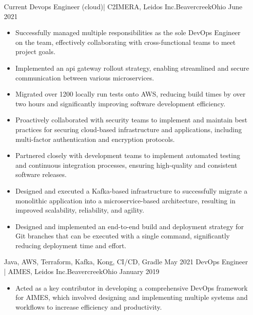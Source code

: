 %
%
%
\begin{experiences}

  \experience
  {Current} {Devops Engineer (cloud)| C2IMERA, Leidos Inc.}{Beavercreek}{Ohio}
  {June 2021} {
      \begin{itemize}
          \item Successfully managed multiple responsibilities as the sole DevOps Engineer on the team, effectively collaborating with cross-functional teams to meet project goals.
          \item Implemented an api gateway rollout strategy, enabling streamlined and secure communication between various microservices.
          \item Migrated over 1200 locally run tests onto AWS, reducing build times by over two hours and significantly improving software development efficiency.
          \item Proactively collaborated with security teams to implement and maintain best practices for securing cloud-based infrastructure and applications, including multi-factor authentication and encryption protocols.
          \item Partnered closely with development teams to implement automated testing and continuous integration processes, ensuring high-quality and consistent software releases.
          \item Designed and executed a Kafka-based infrastructure to successfully migrate a monolithic application into a microservice-based architecture, resulting in improved scalability, reliability, and agility.
          \item Designed and implemented an end-to-end build and deployment strategy for Git branches that can be executed with a single command, significantly reducing deployment time and effort.
      \end{itemize}
  }
  {Java, AWS, Terraform, Kafka, Kong, CI/CD, Gradle}
  \emptySeparator
  \experience
  {May 2021} {DevOps Engineer | AIMES, Leidos Inc.}{Beavercreek}{Ohio}
  {January 2019} {
      \begin{itemize}
          \item Acted as a key contributor in developing a comprehensive DevOps framework for AIMES, which involved designing and implementing multiple systems and workflows to increase efficiency and productivity.

\end{itemize}}
\end{experiences}
